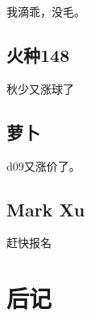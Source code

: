 \documentclass[12pt]{report}
\begin{document}
 我滴乖，没毛。
 
 \section*{火种148}
 
 秋少又涨球了
 
 \section*{萝卜}
 
 d09又涨价了。
 
 \section*{Mark Xu}
 
 赶快报名
 
 
 
 

   
   
   \clearpage %
   
   
   \tableofcontents %
   \clearpage %
   
	\setcounter{chapter}{0} 
	\clearpage
	
	\chapter*{后记}
	
	
\end{document}
